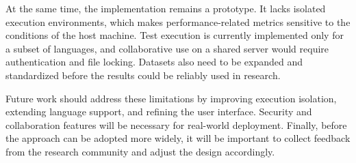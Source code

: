 At the same time, the implementation remains a prototype. It lacks isolated execution environments, which makes performance-related metrics sensitive to the conditions of the host machine. Test execution is currently implemented only for a subset of languages, and collaborative use on a shared server would require authentication and file locking. Datasets also need to be expanded and standardized before the results could be reliably used in research.

Future work should address these limitations by improving execution isolation, extending language support, and refining the user interface. Security and collaboration features will be necessary for real-world deployment. Finally, before the approach can be adopted more widely, it will be important to collect feedback from the research community and adjust the design accordingly.
